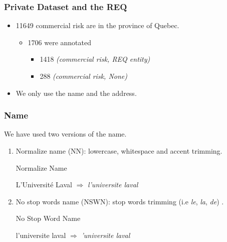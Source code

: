 \documentclass{beamer}
\begin{document}
	\begin{frame}[label=intact-REQ]\frametitle{Private Dataset and the REQ} 
		\begin{itemize}
			\item<1-> \num{11649} commercial risk are in the province of Quebec.
			\begin{itemize}
				\item<2-> \num{1706} were annotated
				\begin{itemize}
					\item<3->  \num{1418} \textit{(commercial risk, REQ entity)}
					\item<3->  288 \textit{(commercial risk, None)}
				\end{itemize}
			\end{itemize}
			\item<4-> We only use the name and the address.
		\end{itemize}
	\end{frame}
	
	\begin{frame}\frametitle{Name} 
    	We have used two versions of the name.
		\begin{enumerate}
			\item<1-> Normalize name (NN): lowercase, whitespace and accent trimming.
			\begin{block}{Normalize Name}
				\begin{center}
					L'Université Laval $\Rightarrow$ \textit{l'universite laval}
				\end{center}
			\end{block}
			\item<2-> No stop words name (NSWN): stop words trimming (i.e \textit{le}, \textit{la}, \textit{de}) \cite{NLP-book-stop-word}.
			\begin{block}{No Stop Word Name}
				\begin{center}
					l'universite laval $\Rightarrow$ \textit{'universite laval}
				\end{center}
			\end{block}
		\end{enumerate}
	\end{frame}
	
\end{document}
